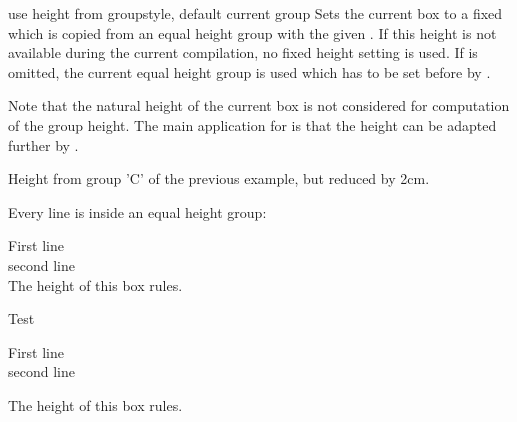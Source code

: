 \clearpage
\begin{docTcbKey}[][doc new and updated={2015-11-27}{2016-02-22}]{use height from group}{}{style, default current group}
  Sets the current box to a fixed  which is copied from
  an equal height group with the given . If this height is not
  available during the current compilation, no fixed height setting is used.
  If  is omitted, the current equal height group is used which has
  to be set before by .\par
  Note that the natural height of the current box is not considered for
  computation of the group height. The main application for
   is that the height can be adapted
  further by .

\begin{dispExample}
\begin{tcolorbox}[use height from group=C,add to height=-2cm,
  colframe=blue!75!black,colback=white]
Height from group 'C' of the previous example, but reduced by 2cm.
\end{tcolorbox}%
\end{dispExample}

\begin{dispExample}
Every line is inside an equal height group:
\begin{tcbraster}[raster equal height=rows,
    title=Box \thetcbrasternum,
    enhanced,size=small,colframe=red!50!black,colback=red!10!white]
  \begin{tcolorbox}First line\\second line\\
    The height of this box rules.\end{tcolorbox}
  \begin{tcolorbox}Test\end{tcolorbox}
  \begin{tcolorbox}
    First line\\second line\end{tcolorbox}
  \begin{tcolorbox}The height of this box rules.\end{tcolorbox}
\end{tcbraster}
\end{dispExample}
\end{docTcbKey}



